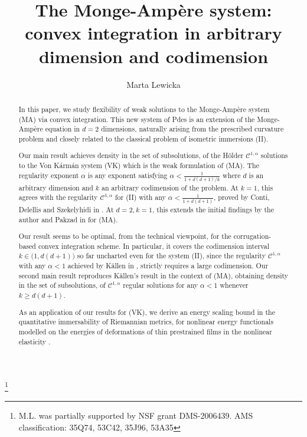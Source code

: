\documentclass[reqno,twoside,11pt]{amsart}
\numberwithin{equation}{section}
\theoremstyle{plain}
\theoremstyle{definition}
\begin{document}
\title[The Monge-Amp\`ere system]{The Monge-Amp\`ere system: convex integration in arbitrary
  dimension and codimension}
\author{Marta Lewicka}
\address{M.L.: University of Pittsburgh, Department of Mathematics, 
139 University Place, Pittsburgh, PA 15260}

\thanks{M.L. was partially supported by NSF grant DMS-2006439. 
AMS classification: 35Q74, 53C42, 35J96, 53A35}

\begin{abstract}
In this paper, we study flexibility of weak solutions to the Monge-Amp\`ere system (MA) via convex
integration. %
This new system of Pdes is an extension of the Monge-Amp\`ere
equation in $d=2$ dimensions, naturally arising  from the prescribed curvature
problem and closely related to the classical problem of isometric immersions (II).

Our main result achieves density in the set of subsolutions, of the H\"older 
$\mathcal{C}^{1,\alpha}$ solutions to the Von K\'arm\'an system (VK)
which is the weak formulation of (MA). The regularity exponent $\alpha$ is any
exponent satisfying $\alpha<\frac{1}{1+
  d(d+1)/k}$ where $d$ is an arbitrary dimension and $k$ an
arbitrary codimension of the problem. At $k=1$, this agrees with the 
regularity $\mathcal{C}^{1,\alpha}$ for (II) with any $\alpha 
<\frac{1}{1+d(d+1)}$, proved by Conti, Delellis and Szekelyhidi in \cite{CS}. 
At $d=2, k=1$, this extends the initial findings by the author and Pakzad in
\cite{lewpak_MA} for (MA).

Our result seems to be optimal, from the technical viewpoint, for the
corrugation-based convex integration scheme. In particular, it covers the 
codimension interval $k\in \big(1, d(d+1)\big)$ so far uncharted 
even for the system (II), since the 
regularity $\mathcal{C}^{1,\alpha}$ with any $\alpha <1$ achieved by
K\"allen in \cite{Kallen}, strictly requires a large codimension.
Our second main result reproduces K\"allen's result in the context of (MA), obtaining
density in the set of
subsolutions, of $\mathcal{C}^{1,\alpha}$ regular solutions for any
$\alpha<1$ whenever $k\geq d(d+1)$. 

As an application of our results for (VK), we derive an energy scaling bound in the quantitative
immersability of Riemannian metrics, for nonlinear energy functionals 
modelled on the energies of deformations of thin prestrained
films in the nonlinear elasticity \cite{lew_book}.
\end{abstract}
\end{document}

